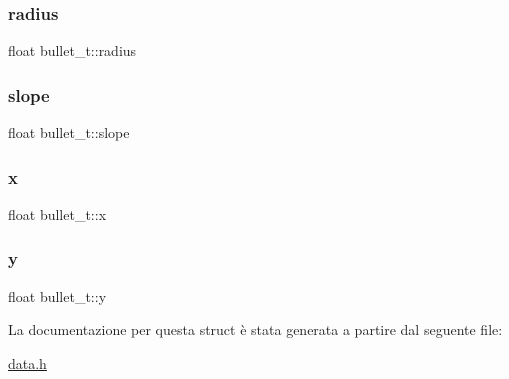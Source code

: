 \subsubsection{\texorpdfstring{radius}{radius}}
{\footnotesize\ttfamily float bullet\+\_\+t\+::radius}

\mbox{\label{structbullet__t_a0963dc6b0252c985a01f059e92eace09}} 
\subsubsection{\texorpdfstring{slope}{slope}}
{\footnotesize\ttfamily float bullet\+\_\+t\+::slope}

\mbox{\label{structbullet__t_ab0b36c8d15cc32e097f747f274af575b}} 
\subsubsection{\texorpdfstring{x}{x}}
{\footnotesize\ttfamily float bullet\+\_\+t\+::x}

\mbox{\label{structbullet__t_a6fe52258dc3b178d28487fae71363524}} 
\subsubsection{\texorpdfstring{y}{y}}
{\footnotesize\ttfamily float bullet\+\_\+t\+::y}



La documentazione per questa struct è stata generata a partire dal seguente file\+:\begin{DoxyCompactItemize}
\item 
\hyperlink{data_8h}{data.\+h}\end{DoxyCompactItemize}
